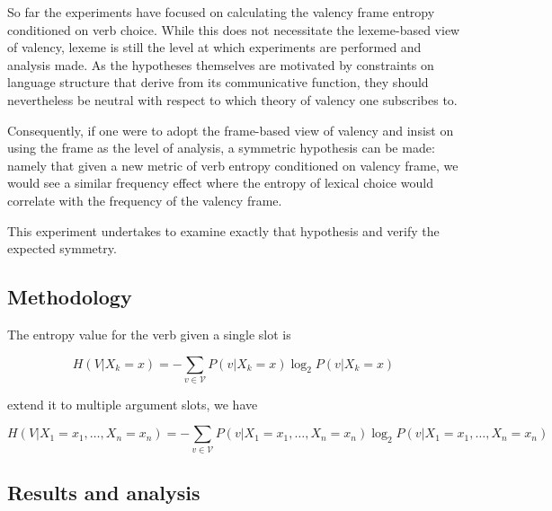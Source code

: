 So far the experiments have focused on calculating the valency frame entropy conditioned on verb choice. While this does not necessitate the lexeme-based view of valency, lexeme is still the level at which experiments are performed and analysis made. As the hypotheses themselves are motivated by constraints on language structure that derive from its communicative function, they should nevertheless be neutral with respect to which theory of valency one subscribes to. 

Consequently, if one were to adopt the frame-based view of valency and insist on using the frame as the level of analysis, a symmetric hypothesis can be made: namely that given a new metric of verb entropy conditioned on valency frame, we would see a similar frequency effect where the entropy of lexical choice would correlate with the frequency of the valency frame. 

This experiment undertakes to examine exactly that hypothesis and verify the expected symmetry.

\subsection{Methodology}

The entropy value for the verb given a single slot is

$$
H(V|X_{k}=x)=
-\sum\limits_{v\in{}\mathcal{V}}{P(v|X_k=x)\log_{2}{P(v|X_k=x)}}
$$

extend it to multiple argument slots, we have

$$
H(V|X_1=x_1,\ldots,X_n=x_n)=
-\sum\limits_{v\in{}\mathcal{V}}{P(v|X_1=x_1,\ldots,X_n=x_n)\log_2P(v|X_1=x_1,\ldots,X_n=x_n)}
$$

\subsection{Results and analysis}

